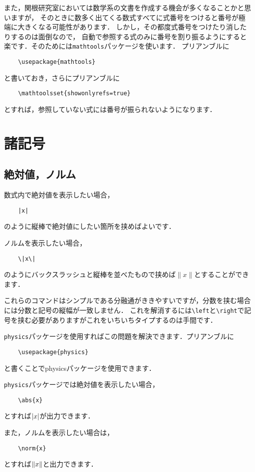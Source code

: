\documentclass[a4paper,11pt]{ltjsreport}
\numberwithin{equation}{section}
\theoremstyle{definition}
\begin{document}
また，関根研究室においては数学系の文書を作成する機会が多くなることかと思いますが，
そのときに数多く出てくる数式すべてに式番号をつけると番号が極端に大きくなる可能性があります．
しかし，その都度式番号をつけたり消したりするのは面倒なので，
自動で参照する式のみに番号を割り振るようにすると楽です．そのためには\verb|mathtools|パッケージを使います．
プリアンブルに
\begin{verbatim}
    \usepackage{mathtools}
\end{verbatim}
と書いておき，さらにプリアンブルに
\begin{verbatim}
    \mathtoolsset{showonlyrefs=true}
\end{verbatim}
とすれば，参照していない式には番号が振られないようになります\cite{FomulaNumber}．


\section{諸記号}

\subsection{絶対値，ノルム}

数式内で絶対値を表示したい場合，
\begin{verbatim}
    |x|
\end{verbatim}
のように縦棒で絶対値にしたい箇所を挟めばよいです．

ノルムを表示したい場合，
\begin{verbatim}
    \|x\|
\end{verbatim}
のようにバックスラッシュと縦棒を並べたもので挟めば$\|x\|$とすることができます．

これらのコマンドはシンプルである分融通がききやすいですが，分数を挟む場合には分数と記号の縦幅が一致しません．
これを解消するには\verb|\left|と\verb|\right|で記号を挟む必要がありますがこれをいちいちタイプするのは手間です．

\verb|physics|パッケージを使用すればこの問題を解決できます．プリアンブルに
\begin{verbatim}
    \usepackage{physics}
\end{verbatim}
と書くことでphysicsパッケージを使用できます．

\verb|physics|パッケージでは絶対値を表示したい場合，
\begin{verbatim}
    \abs{x}
\end{verbatim}
とすれば$\abs{x}$が出力できます．

また，ノルムを表示したい場合は，
\begin{verbatim}
    \norm{x}
\end{verbatim}
とすれば$\norm{x}$と出力できます．
\end{document}
